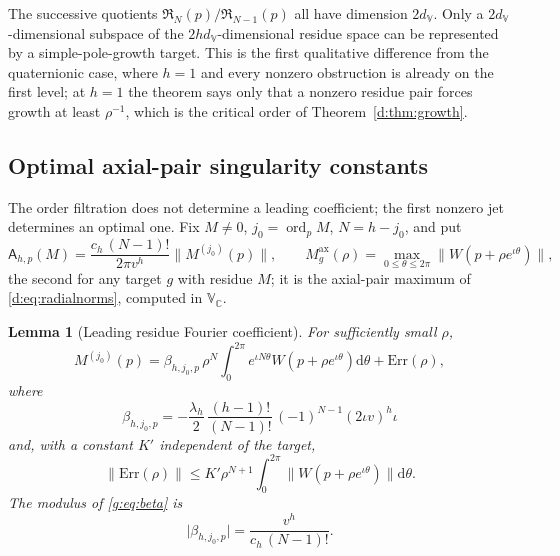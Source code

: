 \documentclass[11pt,a4paper]{article}
\numberwithin{equation}{section}
\newtheorem{lemma}[theorem]{Lemma}
\theoremstyle{definition}
\theoremstyle{remark}
\theoremstyle{plain}
\newcommand{\CC}{\mathbb C}
\newcommand{\Max}{M^{\mathrm{ax}}}                    %
\newcommand{\abs}[1]{\lvert #1\rvert}
\newcommand{\norm}[1]{\lVert #1\rVert}
\newcommand{\dd}{\mathrm d}
\newcommand{\VV}{\mathbb V}                       %
\newcommand{\VC}{\mathbb V_{\CC}}                 %
\newcommand{\dV}{d_{\VV}}                         %
\newcommand{\Rfilt}{\mathfrak R}                  %
\DeclareMathOperator{\ord}{ord}
\begin{document}
The successive quotients $\Rfilt_N(p)/\Rfilt_{N-1}(p)$ all have dimension
$2\dV$. Only a $2\dV$-dimensional subspace of the $2h\dV$-dimensional residue
space can be represented by a simple-pole-growth target. This is the first
qualitative difference from the quaternionic case, where $h=1$ and every
nonzero obstruction is already on the first level; at $h=1$ the theorem says
only that a nonzero residue pair forces growth at least $\rho^{-1}$, which is
the critical order of Theorem~\ref{d:thm:growth}.

\subsection{Optimal axial-pair singularity constants}
\label{g:sub:sharp}

The order filtration does not determine a leading coefficient; the first
nonzero jet determines an optimal one. Fix $M\ne0$, $j_0=\ord_pM$, $N=h-j_0$,
and put
\begin{equation}\label{g:eq:Aconstant}
 \mathsf A_{h,p}(M)=\frac{c_h\,(N-1)!}{2\pi v^h}\norm{M^{(j_0)}(p)},
 \qquad
 \Max_g(\rho)=\max_{0\le\theta\le2\pi}\norm{W(p+\rho e^{\iota\theta})},
\end{equation}
the second for any target $g$ with residue $M$; it is the axial-pair maximum
of \eqref{d:eq:radialnorms}, computed in $\VC$.

\begin{lemma}[Leading residue Fourier coefficient]
\label{g:lem:fourier}
For sufficiently small $\rho$,
\begin{equation}\label{g:eq:fourier-extraction}
 M^{(j_0)}(p)=\beta_{h,j_0,p}\,\rho^N\int_0^{2\pi}e^{\iota N\theta}
 W(p+\rho e^{\iota\theta})\dd\theta+\mathrm{Err}(\rho),
\end{equation}
where
\begin{equation}\label{g:eq:beta}
 \beta_{h,j_0,p}=-\frac{\lambda_h}{2}\,\frac{(h-1)!}{(N-1)!}\,(-1)^{N-1}
 (2\iota v)^h\iota
\end{equation}
and, with a constant $K'$ independent of the target,
\begin{equation}\label{g:eq:fourier-error}
 \norm{\mathrm{Err}(\rho)}\le K'\rho^{N+1}\int_0^{2\pi}
 \norm{W(p+\rho e^{\iota\theta})}\dd\theta .
\end{equation}
The modulus of \eqref{g:eq:beta} is
\begin{equation}\label{g:eq:beta-modulus}
 \abs{\beta_{h,j_0,p}}=\frac{v^h}{c_h\,(N-1)!}.
\end{equation}
\end{lemma}
\end{document}
